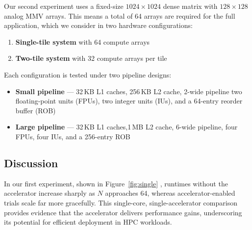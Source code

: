\documentclass[sigconf, review]{acmart}
\begin{document}
Our second experiment uses a fixed-size $1024\times1024$ dense matrix with $128\times128$ analog MMV arrays. This means a total of 64 arrays are required for the full application, which we consider in two hardware configurations:
\begin{enumerate}
    \item \textbf{Single-tile system} with 64 compute arrays
    \item \textbf{Two-tile system} with 32 compute arrays per tile
\end{enumerate}

Each configuration is tested under two pipeline designs:
\begin{itemize}
    \item \textbf{Small pipeline} --- 32\,KB L1 caches, 256\,KB L2 cache, 2-wide pipeline two floating-point units (FPUs), two integer units (IUs), and a 64-entry reorder buffer (ROB)
    \item \textbf{Large pipeline} --- 32\,KB L1 caches,1\,MB L2 cache, 6-wide pipeline, four FPUs, four IUs, and a 256-entry ROB
\end{itemize}

\subsection{Discussion}


In our first experiment, shown in Figure~\ref{fig:single} , runtimes without the accelerator increase sharply as $N$ approaches 64, whereas accelerator-enabled trials scale far more gracefully.
This single-core, single-accelerator comparison provides evidence that the accelerator delivers  performance gains, underscoring its potential for efficient deployment in HPC workloads.




\end{document}
